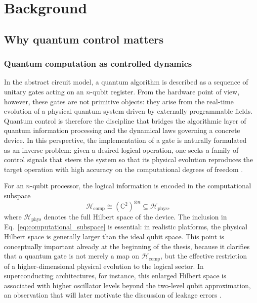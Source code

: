 \chapter{Background}
\section{Why quantum control matters}
\subsection{Quantum computation as controlled dynamics}
\label{subsec:quantum_computation_controlled_dynamics}

In the abstract circuit model, a quantum algorithm is described as a sequence of unitary gates acting on an $n$-qubit register. From the hardware point of view, however, these gates are not primitive objects: they arise from the real-time evolution of a physical quantum system driven by externally programmable fields. Quantum control is therefore the discipline that bridges the algorithmic layer of quantum information processing and the dynamical laws governing a concrete device. In this perspective, the implementation of a gate is naturally formulated as an inverse problem: given a desired logical operation, one seeks a family of control signals that steers the system so that its physical evolution reproduces the target operation with high accuracy on the computational degrees of freedom \cite{Palao2003,Koch2022,Mahesh2023,Niu2019}.

For an $n$-qubit processor, the logical information is encoded in the computational subspace
\begin{equation}
\mathcal{H}_{\mathrm{comp}}
\cong
(\mathbb{C}^{2})^{\otimes n}
\subseteq
\mathcal{H}_{\mathrm{phys}},
\label{eq:computational_subspace}
\end{equation}
where $\mathcal{H}_{\mathrm{phys}}$ denotes the full Hilbert space of the device. The inclusion in Eq.~\eqref{eq:computational_subspace} is essential: in realistic platforms, the physical Hilbert space is generally larger than the ideal qubit space. This point is conceptually important already at the beginning of the thesis, because it clarifies that a quantum gate is not merely a map on $\mathcal{H}_{\mathrm{comp}}$, but the effective restriction of a higher-dimensional physical evolution to the logical sector. In superconducting architectures, for instance, this enlarged Hilbert space is associated with higher oscillator levels beyond the two-level qubit approximation, an observation that will later motivate the discussion of leakage errors \cite{Palao2003,Niu2019}.

